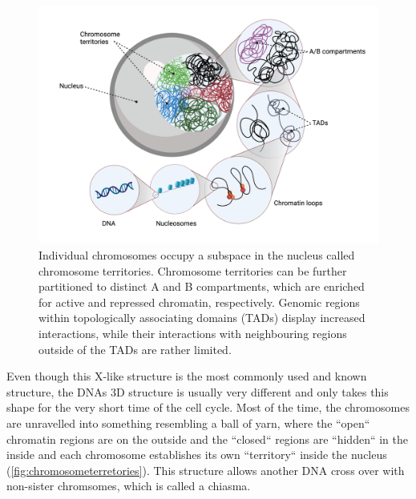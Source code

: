 \begin{figure}[!ht]
\centering
\includegraphics[width=0.9\linewidth]{Figures/ChromosomeTerritories.png}
\caption[Overview DNA structure]{Individual chromosomes occupy a subspace in the nucleus called chromosome territories. Chromosome territories can be further partitioned to distinct A and B compartments, which are enriched for active and repressed chromatin, respectively. Genomic regions within topologically associating domains (TADs) display increased interactions, while their interactions with neighbouring regions outside of the TADs are rather limited.}\label{fig:chromosometerretories}
\end{figure}

Even though this X-like structure is the most commonly used and known structure, the DNAs 3D structure is usually very different and only takes this shape for the very short time of the cell cycle. Most of the time, the chromosomes are unravelled into something resembling a ball of yarn, where the ``open`` chromatin regions are on the outside and the ``closed`` regions are ``hidden`` in the inside and each chromosome establishes its own ``territory`` inside the nucleus (\autoref{fig:chromosometerretories}). This structure allows another DNA cross over with non-sister chromsomes, which is called a chiasma.

